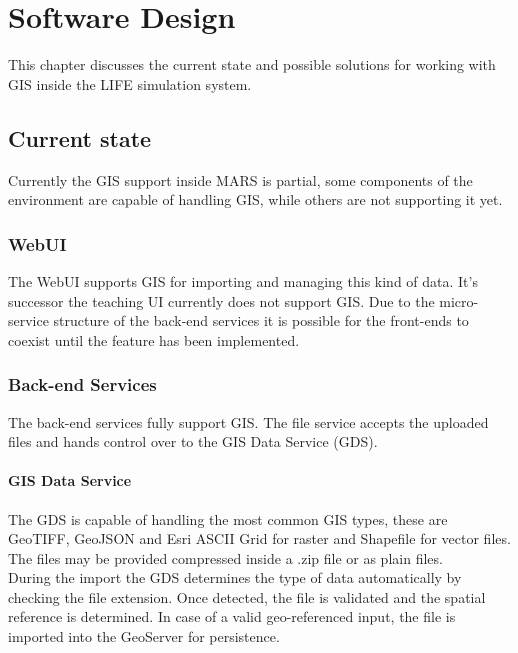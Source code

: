 
\chapter{Software Design}
\label{sec:software_design}
This chapter discusses the current state and possible solutions for working with GIS inside the LIFE simulation system.



\section{Current state}
Currently the GIS support inside MARS is partial, some components of the environment are capable of handling GIS, while others are not supporting it yet.


\subsection{WebUI}
The WebUI supports GIS for importing and managing this kind of data. It's successor the teaching UI currently does not support GIS. Due to the micro-service structure of the back-end services it is possible for the front-ends to coexist until the feature has been implemented.

\subsection{Back-end Services}
The back-end services fully support GIS. The file service accepts the uploaded files and hands control over to the GIS Data Service (GDS). 

\subsubsection{GIS Data Service}
The GDS is capable of handling the most common GIS types, these are GeoTIFF, GeoJSON and Esri ASCII Grid for raster and Shapefile for vector files. The files may be provided compressed inside a .zip file or as plain files.\\
During the import the GDS determines the type of data automatically by checking the file extension. Once detected, the file is validated and the spatial reference is determined. In case of a valid geo-referenced input, the file is imported into the GeoServer for persistence.


